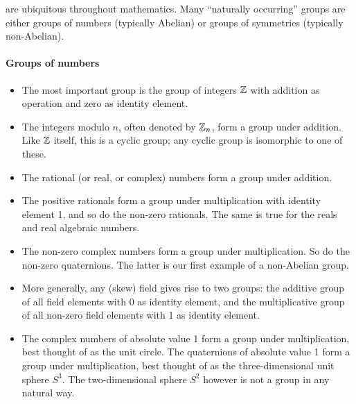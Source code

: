 \documentclass[12pt]{article}
\begin{document}

   are ubiquitous throughout mathematics. Many ``naturally
  occurring'' groups are either groups of numbers (typically Abelian)
  or groups of symmetries (typically non-Abelian).

\paragraph{Groups of numbers}

\begin{itemize}

\item The most important group is the group of integers $\Bbb{Z}$ with
addition as operation and zero as identity element.

\item The integers modulo $n$, often denoted by $\Bbb{Z}_n$, form a
group under addition. Like $\Bbb{Z}$ itself, this is a cyclic group; any
cyclic group is isomorphic to one of these. 

\item The rational (or real, or complex) numbers form a group under
addition.

\item The positive rationals form a group under multiplication with identity element 1, and so
do the non-zero rationals. The same is true for the reals and real algebraic numbers.

\item The non-zero complex numbers form a group under multiplication.
So do the non-zero quaternions. The latter is our first example of a
non-Abelian group.

\item More generally, any (skew) field gives rise to two groups: the additive
group of all field elements with 0 as identity element, and the multiplicative group of all
non-zero field elements with 1 as identity element.

\item The complex numbers of absolute value 1 form a group under
multiplication, best thought of as the unit circle. The quaternions of
absolute value 1 form a group under multiplication, best thought of as
the three-dimensional unit sphere $S^3$. The two-dimensional sphere
$S^2$ however
is not a group in any natural way.


\end{itemize}
\end{document}
